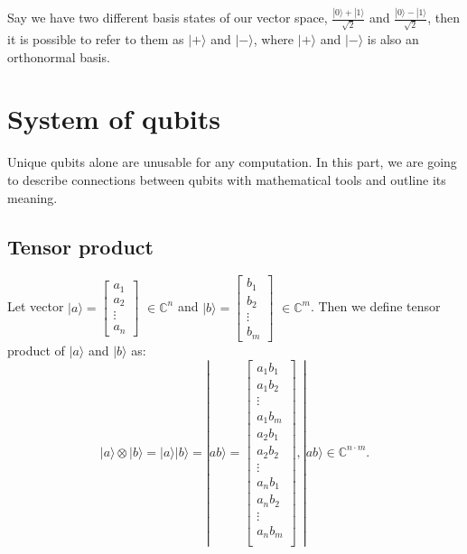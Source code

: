 Say we have two different basis states of our vector space, $\frac{|0\rangle + |1\rangle}{\sqrt{2}}$ and $ \frac{|0\rangle - |1\rangle}{\sqrt{2}}$, then it is possible to refer to them as $|+\rangle$ and $|-\rangle$, where $|+\rangle$ and $|-\rangle$ is also an orthonormal basis.



\section{System of qubits}

Unique qubits alone are unusable for any computation. In this part, we are going to describe connections between qubits with mathematical tools and outline its meaning.

\subsection{Tensor product}
 Let vector $ |a\rangle =
%
%
\begin{bmatrix}
     a_1\\
     a_2\\
     \vdots\\
     a_n
\end{bmatrix}$ 
%
%
$\in \mathbb{C}^n $ and 
%
%
$ |b\rangle =
\begin{bmatrix}
     b_1\\
     b_2\\
     \vdots\\
     b_m
\end{bmatrix}$ $\in \mathbb{C}^m$. 
Then we define tensor product of $|a\rangle$ and $|b\rangle$ as: 
\begin{equation}
|a\rangle \otimes |b\rangle = |a\rangle |b\rangle = |ab\rangle =\begin{bmatrix}
     a_1  b_1\\
     a_1  b_2\\
     \vdots\\
     a_1  b_m\\
     a_2  b_1\\
     a_2  b_2\\
     \vdots\\
     a_n  b_1\\
     a_n  b_2\\
     \vdots\\
     a_n  b_m\\
\end{bmatrix}
, |ab\rangle \in \mathbb{C}^{n \cdot m} .
\end{equation}

